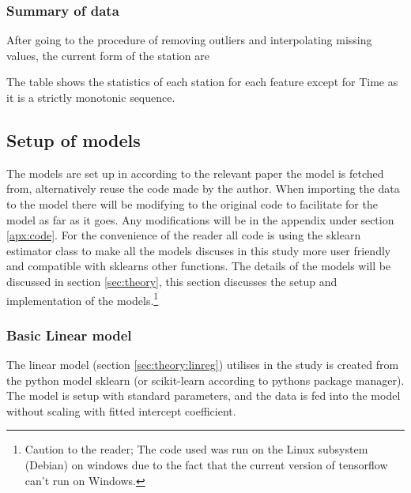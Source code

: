 \subsubsection{Summary of data}

After going to the procedure of removing outliers and interpolating missing values, the current form of the station are

\begin{table}
	\centering
	\begin{adjustwidth}{-1in}{1in}
		
	\end{adjustwidth}
	\caption[Table of station statistics]{The table shows the statistics of each station for each feature except for Time as it is a strictly monotonic sequence.}
\end{table}

\subsection{Setup of models}

The models are set up in according to the relevant paper the model is fetched from, alternatively reuse the code made by the author. When importing the data to the model there will be modifying to the original code to facilitate for the model as far as it goes. Any modifications will be in the appendix under section \ref{apx:code}. For the convenience of the reader all code is using the sklearn estimator class to make all the models discuses in this study more user friendly and compatible with sklearns other functions. The details of the models will be discussed in section \ref{sec:theory}, this section discusses the setup and implementation of the models.\footnote{Caution to the reader; The code used was run on the Linux subsystem (Debian) on windows due to the fact that the current version of tensorflow can't run on Windows.}

\subsubsection{Basic Linear model}

The linear model (section \ref{sec:theory:linreg}) utilises in the study is created from the python model sklearn (or scikit-learn according to pythons package manager). The model is setup with standard parameters, and the data is fed into the model without scaling with fitted intercept coefficient. 

